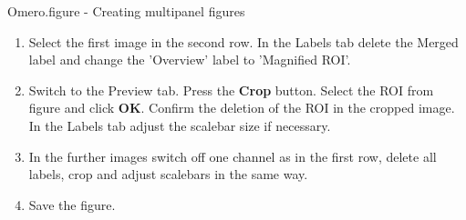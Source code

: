 \begin{taskbox}{Omero.figure - Creating multipanel figures}
\begin{enumerate}
    \item Select the first image in the second row. In the Labels tab delete the Merged label and change the 'Overview' label to 'Magnified ROI'.
    \item Switch to the Preview tab. Press the \textbf{Crop} button. Select the ROI from figure and click \textbf{OK}. Confirm the deletion of the ROI in the cropped image. In the Labels tab adjust the scalebar size if necessary.
    \item In the further images switch off one channel as in the first row, delete all labels, crop and adjust scalebars in the same way.
    \item Save the figure.
  \end{enumerate}
  
\end{taskbox}


